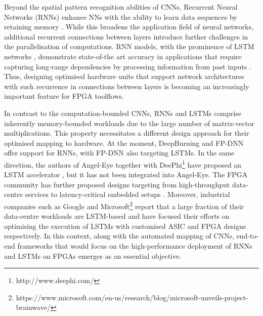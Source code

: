 \documentclass[format=acmsmall, review=false, screen=true]{acmart}
\begin{document}
Beyond the spatial pattern recognition abilities of CNNs, Recurrent Neural Networks (RNNs) enhance NNs with the ability to learn data sequences by retaining memory \cite{mikolov2010recurrent}. While this broadens the application field of neural networks, additional recurrent connections between layers introduce further challenges in the parallelisation of computations. RNN models, with the prominence of LSTM networks \cite{lstm1997}, demonstrate state-of-the art accuracy in applications that require capturing long-range dependencies by processing information from past inputs \cite{Vinyals_2017}. Thus, designing optimised hardware units that support network architectures with such recurrence in connections between layers is becoming an increasingly important feature for FPGA toolflows. 

In contrast to the computation-bounded CNNs, RNNs and LSTMs comprise inherently memory-bounded workloads due to the large number of matrix-vector multiplications. This property necessitates a different design approach for their optimised mapping to hardware. At the moment, DeepBurning and FP-DNN offer support for RNNs, with FP-DNN also targeting LSTMs. In the same direction, the authors of Angel-Eye together with DeePhi\footnote{http://www.deephi.com/} have proposed an LSTM accelerator \cite{Han_2017}, but it has not been integrated into Angel-Eye. {\color{black}The FPGA community has further proposed designs targeting from high-throughput data-centre services \cite{Nurvitadhi_2016} to latency-critical embedded setups \cite{approxlstm2018arc}. Moreover, industrial companies such as Google \cite{Jouppi2017} and Microsoft\footnote{https://www.microsoft.com/en-us/research/blog/microsoft-unveils-project-brainwave/} report that a large fraction of their data-centre workloads are LSTM-based and have focused their efforts on optimising the execution of LSTMs with customised ASIC and FPGA designs respectively. In this context, along with the automated mapping of CNNs, end-to-end frameworks that would focus on the high-performance deployment of RNNs and LSTMs on FPGAs emerges as an essential objective.}
\end{document}
